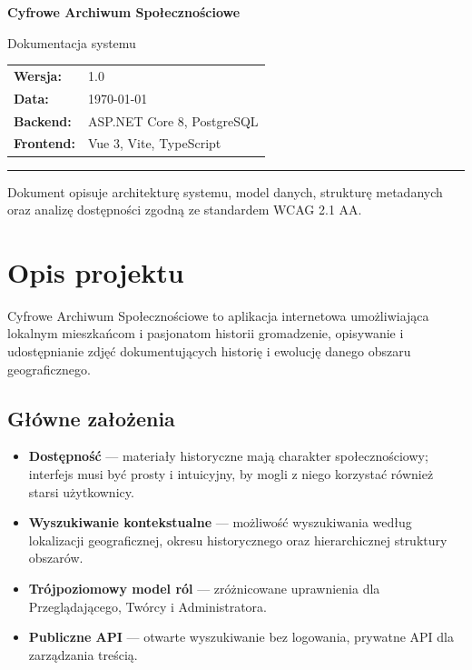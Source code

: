 \documentclass[12pt, a4paper]{article}
\begin{document}

\begin{titlepage}
  \centering
  \vspace*{3cm}

  {\huge\bfseries\color{primary} Cyfrowe Archiwum Społecznościowe\par}
  \vspace{0.5cm}
  {\Large Dokumentacja systemu\par}
  \vspace{3cm}

  \begin{tabular}{ll}
    \textbf{Wersja:}     & 1.0 \\[4pt]
    \textbf{Data:}        & \today \\[4pt]
    \textbf{Backend:}     & ASP.NET Core 8, PostgreSQL \\[4pt]
    \textbf{Frontend:}    & Vue 3, Vite, TypeScript \\[4pt]
  \end{tabular}

  \vfill
  \hrule
  \vspace{0.4cm}
  {\small Dokument opisuje architekturę systemu, model danych, strukturę metadanych
  oraz analizę dostępności zgodną ze standardem WCAG 2.1 AA.}
\end{titlepage}

\tableofcontents
\newpage

\section{Opis projektu}

Cyfrowe Archiwum Społecznościowe to aplikacja internetowa umożliwiająca lokalnym
mieszkańcom i pasjonatom historii gromadzenie, opisywanie i udostępnianie zdjęć
dokumentujących historię i ewolucję danego obszaru geograficznego.

\subsection{Główne założenia}

\begin{itemize}
  \item \textbf{Dostępność} --- materiały historyczne mają charakter społecznościowy;
        interfejs musi być prosty i intuicyjny, by mogli z niego korzystać również
        starsi użytkownicy.
  \item \textbf{Wyszukiwanie kontekstualne} --- możliwość wyszukiwania według lokalizacji
        geograficznej, okresu historycznego oraz hierarchicznej struktury obszarów.
  \item \textbf{Trójpoziomowy model ról} --- zróżnicowane uprawnienia dla Przeglądającego,
        Twórcy i Administratora.
  \item \textbf{Publiczne API} --- otwarte wyszukiwanie bez logowania, prywatne API
        dla zarządzania treścią.
\end{itemize}
\end{document}
